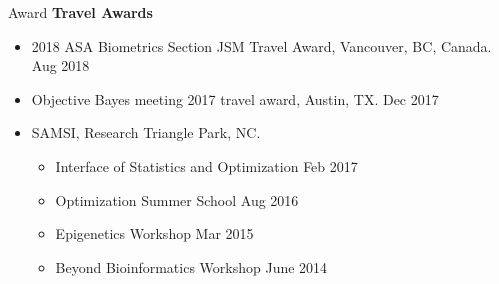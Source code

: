\documentclass{resume} %
\begin{document}
\begin{rSection}{Award}
\textbf{Travel Awards} 

\begin{itemize}[noitemsep,topsep=0pt]
\item 2018 ASA Biometrics Section JSM Travel Award, Vancouver, BC, Canada. \hfill Aug 2018
\end{itemize}

\begin{itemize}[noitemsep,topsep=0pt]
\item Objective Bayes meeting 2017 travel award, Austin, TX. \hfill Dec 2017
\end{itemize}

\begin{itemize}[noitemsep,topsep=0pt]
\item SAMSI, Research Triangle Park, NC.	
\begin{itemize}[noitemsep,topsep=0pt]
\item {Interface of Statistics and Optimization} \hfill Feb 2017
\item {Optimization Summer School} \hfill Aug 2016
\item {Epigenetics Workshop} \hfill Mar 2015
\item {Beyond Bioinformatics Workshop} \hfill June 2014
\end{itemize}

\end{itemize}

\end{rSection}

\end{document}
